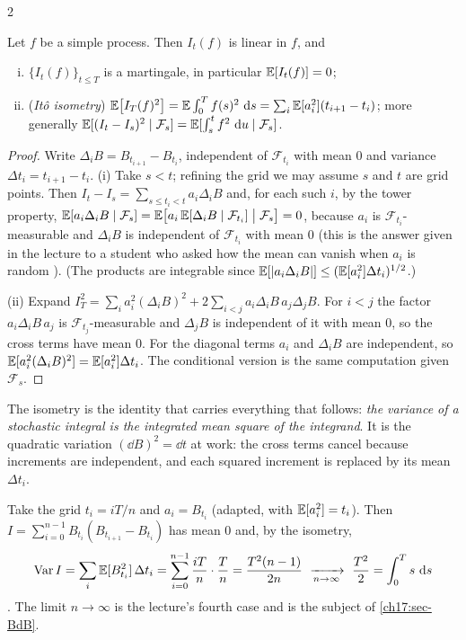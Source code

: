 \begin{paracol}{2}
\begin{proposition}\label{ch17:prop-simple}
Let $f$ be a simple process. Then $I_t(f)$ is linear in $f$, and
\begin{enumerate}[(i)]
  \item $\{I_t(f)\}_{t\le T}$ is a martingale, in particular $\mathbb{E}[I_t(f)]=0$;
  \item (\emph{It\^o isometry}) $\mathbb{E}\bigl[I_T(f)^2\bigr]=\mathbb{E}\int_0^Tf(s)^2\,\,\mathrm{d} s=\sum_i\mathbb{E}[a_i^2](t_{i+1}-t_i)$; more generally
        $\mathbb{E}[(I_t-I_s)^2\mid\mathcal F_s]=\mathbb{E}[\int_s^tf^2\,\,\mathrm{d} u\mid\mathcal F_s]$.
\end{enumerate}
\end{proposition}
\begin{proof}
Write $\Delta_iB=B_{t_{i+1}}-B_{t_i}$, independent of $\mathcal F_{t_i}$ with mean $0$ and variance $\Delta t_i=t_{i+1}-t_i$.
(i) Take $s<t$; refining the grid we may assume $s$ and $t$ are grid points. Then $I_t-I_s=\sum_{s\le t_i<t}a_i\Delta_iB$ and, for each such $i$,
by the tower property, $\mathbb{E}[a_i\Delta_iB\mid\mathcal F_s]=\mathbb{E}\bigl[a_i\,\mathbb{E}[\Delta_iB\mid\mathcal F_{t_i}]\bigm|\mathcal F_s\bigr]=0$, because $a_i$ is
$\mathcal F_{t_i}$-measurable and $\Delta_iB$ is independent of $\mathcal F_{t_i}$ with mean $0$
(this is the answer given in the lecture to a student who asked how the mean can vanish when $a_i$ is random
). (The products are integrable since $\mathbb{E}[|a_i\Delta_iB|]\le(\mathbb{E}[a_i^2]\Delta t_i)^{1/2}$.)

(ii) Expand $I_T^2=\sum_ia_i^2(\Delta_iB)^2+2\sum_{i<j}a_i\Delta_iB\,a_j\Delta_jB$. For $i<j$ the factor $a_i\Delta_iB\,a_j$ is $\mathcal F_{t_j}$-measurable
and $\Delta_jB$ is independent of it with mean $0$, so the cross terms have mean $0$. For the diagonal terms $a_i$ and $\Delta_iB$ are independent, so
$\mathbb{E}[a_i^2(\Delta_iB)^2]=\mathbb{E}[a_i^2]\Delta t_i$. The conditional version is the same computation given $\mathcal F_s$.
\end{proof}

The isometry is the identity that carries everything that follows: \emph{the variance of a stochastic integral is the integrated
mean square of the integrand}. It is the quadratic variation $(\dd B)^2=\dd t$ at work: the cross terms cancel because increments are
independent, and each squared increment is replaced by its mean $\Delta t_i$.

\begin{example}\label{ch17:ex-stepBdB}
Take the grid $t_i=iT/n$ and $a_i=B_{t_i}$ (adapted, with $\mathbb{E}[a_i^2]=t_i$). Then $I=\sum_{i=0}^{n-1}B_{t_i}(B_{t_{i+1}}-B_{t_i})$ has mean $0$ and, by the isometry,
\[
  \Var I=\sum_i\E[B_{t_i}^2]\,\Delta t_i=\sum_{i=0}^{n-1}\frac{iT}{n}\cdot\frac Tn=\frac{T^2(n-1)}{2n}\ \xrightarrow[n\to\infty]{}\ \frac{T^2}2=\int_0^Ts\,\dd s
\]
. The limit $n\to\infty$ is the lecture's fourth case and is the subject of \cref{ch17:sec-BdB}.
\end{example}


\end{paracol}

